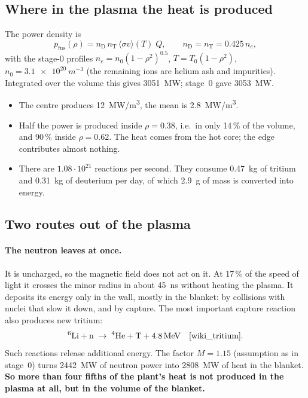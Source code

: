 \subsection{Where in the plasma the heat is produced}
The power density is
\[ p_\mathrm{fus}(\rho) = n_\mathrm{D}\,n_\mathrm{T}\,\langle\sigma v\rangle(T)\;Q,\qquad
   n_\mathrm{D} = n_\mathrm{T} = 0.425\,n_e, \]
with the stage-0 profiles $n_e = n_0(1-\rho^2)^{0.5}$, $T = T_0(1-\rho^2)$, $n_0 = \SI{3.1e20}{m^{-3}}$ (the remaining
ions are helium ash and impurities). Integrated over the volume this gives \SI{3051}{MW}; stage~0 gave \SI{3053}{MW}.
\begin{itemize}
\item The centre produces \SI{12}{MW/m^3}, the mean is \SI{2.8}{MW/m^3}.
\item Half the power is produced inside $\rho = 0.38$, i.e.\ in only 14\,\% of the volume, and 90\,\% inside
  $\rho = 0.62$. The heat comes from the hot core; the edge contributes almost nothing.
\item There are $1.08\cdot10^{21}$ reactions per second. They consume \SI{0.47}{kg} of tritium and \SI{0.31}{kg} of
  deuterium per day, of which \SI{2.9}{g} of mass is converted into energy.
\end{itemize}

\subsection{Two routes out of the plasma}
\paragraph{The neutron leaves at once.} It is uncharged, so the magnetic field does not act on it. At 17\,\% of the
speed of light it crosses the minor radius in about \SI{45}{ns} without heating the plasma. It deposits its energy only
in the wall, mostly in the blanket: by collisions with nuclei that slow it down, and by capture. The most important
capture reaction also produces new tritium:
\[ {}^6\mathrm{Li} + \mathrm{n} \;\rightarrow\; {}^4\mathrm{He} + \mathrm{T} + \SI{4.8}{MeV} \quad\text{\cite{wiki_tritium}}. \]
Such reactions release additional energy. The factor $M = 1.15$ (assumption as in stage~0) turns \SI{2442}{MW} of
neutron power into \SI{2808}{MW} of heat in the blanket. \textbf{So more than four fifths of the plant's heat is not
produced in the plasma at all, but in the volume of the blanket.}

